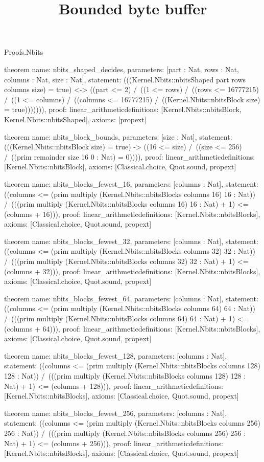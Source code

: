 \begin{lexlean}{Proofs.Nbits}
\title{Bounded byte buffer}
\begin{semanticmodule}
theorem{
  name: nbits_shaped_decides,
  parameters: [part : Nat, rows : Nat, columns : Nat, size : Nat],
  statement: (((Kernel.Nbits::nbitsShaped part rows columns size) = true) <-> ((part <= 2) /\ ((1 <= rows) /\ ((rows <= 16777215) /\ ((1 <= columns) /\ ((columns <= 16777215) /\ ((Kernel.Nbits::nbitsBlock size) = true))))))),
  proof: linear_arithmetic{definitions: [Kernel.Nbits::nbitsBlock, Kernel.Nbits::nbitsShaped]},
  axioms: [propext]
}

theorem{
  name: nbits_block_bounds,
  parameters: [size : Nat],
  statement: (((Kernel.Nbits::nbitsBlock size) = true) -> ((16 <= size) /\ ((size <= 256) /\ ((prim remainder size 16 0 : Nat) = 0)))),
  proof: linear_arithmetic{definitions: [Kernel.Nbits::nbitsBlock]},
  axioms: [Classical.choice, Quot.sound, propext]
}

theorem{
  name: nbits_blocks_fewest_16,
  parameters: [columns : Nat],
  statement: ((columns <= (prim multiply (Kernel.Nbits::nbitsBlocks columns 16) 16 : Nat)) /\ (((prim multiply (Kernel.Nbits::nbitsBlocks columns 16) 16 : Nat) + 1) <= (columns + 16))),
  proof: linear_arithmetic{definitions: [Kernel.Nbits::nbitsBlocks]},
  axioms: [Classical.choice, Quot.sound, propext]
}

theorem{
  name: nbits_blocks_fewest_32,
  parameters: [columns : Nat],
  statement: ((columns <= (prim multiply (Kernel.Nbits::nbitsBlocks columns 32) 32 : Nat)) /\ (((prim multiply (Kernel.Nbits::nbitsBlocks columns 32) 32 : Nat) + 1) <= (columns + 32))),
  proof: linear_arithmetic{definitions: [Kernel.Nbits::nbitsBlocks]},
  axioms: [Classical.choice, Quot.sound, propext]
}

theorem{
  name: nbits_blocks_fewest_64,
  parameters: [columns : Nat],
  statement: ((columns <= (prim multiply (Kernel.Nbits::nbitsBlocks columns 64) 64 : Nat)) /\ (((prim multiply (Kernel.Nbits::nbitsBlocks columns 64) 64 : Nat) + 1) <= (columns + 64))),
  proof: linear_arithmetic{definitions: [Kernel.Nbits::nbitsBlocks]},
  axioms: [Classical.choice, Quot.sound, propext]
}

theorem{
  name: nbits_blocks_fewest_128,
  parameters: [columns : Nat],
  statement: ((columns <= (prim multiply (Kernel.Nbits::nbitsBlocks columns 128) 128 : Nat)) /\ (((prim multiply (Kernel.Nbits::nbitsBlocks columns 128) 128 : Nat) + 1) <= (columns + 128))),
  proof: linear_arithmetic{definitions: [Kernel.Nbits::nbitsBlocks]},
  axioms: [Classical.choice, Quot.sound, propext]
}

theorem{
  name: nbits_blocks_fewest_256,
  parameters: [columns : Nat],
  statement: ((columns <= (prim multiply (Kernel.Nbits::nbitsBlocks columns 256) 256 : Nat)) /\ (((prim multiply (Kernel.Nbits::nbitsBlocks columns 256) 256 : Nat) + 1) <= (columns + 256))),
  proof: linear_arithmetic{definitions: [Kernel.Nbits::nbitsBlocks]},
  axioms: [Classical.choice, Quot.sound, propext]
}
\end{semanticmodule}
\end{lexlean}
